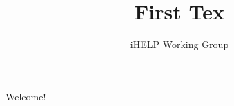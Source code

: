 \documentclass{article}
\title{First Tex}
\author{iHELP Working Group}
\begin{document}
	Welcome! 
\end{document}

